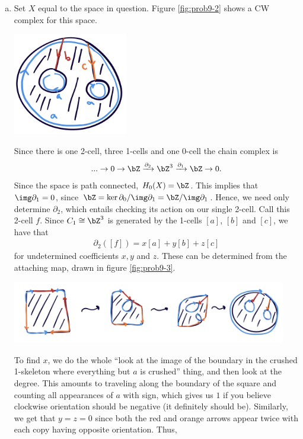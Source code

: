 \begin{homework}[e]
\begin{prf}
\begin{enumerate}[(a)]
    \item Set $X$ equal to the space in question. Figure \ref{fig:prob9-2} shows a CW complex for this space.
      \begin{center}
        \includegraphics[width=5cm]{figures/hwk12-fig2.png}
        \label{fig:prob9-2}
      \end{center}
      Since there is one 2-cell, three 1-cells and one 0-cell the chain complex is
      \begin{align*}
        ... \to 0 \to \bZ \xrightarrow{\partial_2} \bZ^3 \xrightarrow{\partial_1} \bZ \to 0.
      \end{align*}
      Since the space is path connected, $H_0(X) = \bZ$. This implies that $\img \partial_1 = 0$, since $\bZ = \ker \partial_0/\img \partial_1 = \bZ/\img\partial_1$. Hence, we need only determine $\partial_2$, which entails checking its action on our single 2-cell. Call this 2-cell $f$. Since $C_1 \cong \bZ^3$ is generated by the 1-cells $[a]$, $[b]$ and $[c]$, we have that
      \begin{align*}
        \partial_2([f]) = x[a] + y[b] + z[c]
      \end{align*}
      for undetermined coefficients $x,y$ and $z$. These can be determined from the attaching map, drawn in figure \ref{fig:prob9-3}.
      \begin{center}
        \includegraphics[width=12cm]{figures/hwk12-fig3.png}
        \label{fig:prob9-3}
      \end{center}
      To find $x$, we do the whole ``look at the image of the boundary in the crushed 1-skeleton where everything but $a$ is crushed'' thing, and then look at the degree. This amounts to traveling along the boundary of the square and counting all appearances of $a$ with sign, which gives us $1$ if you believe clockwise orientation should be negative (it definitely should be). Similarly, we get that $y = z = 0$ since both the red and orange arrows appear twice with each copy having opposite orientation. Thus,

\end{enumerate}
\end{prf}
\end{homework}
